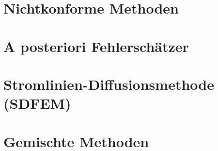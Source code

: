 \documentclass[12pt]{scrartcl}
\begin{document}
	\section{Nichtkonforme Methoden}
	
	\section{A posteriori Fehlerschätzer}
	
	\section{Stromlinien-Diffusionsmethode (SDFEM)}
	
	\section{Gemischte Methoden}
\end{document}
